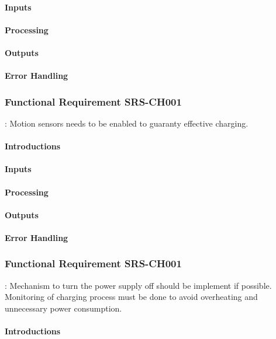 \documentclass[a4paper]{article}
\begin{document}
\paragraph{Inputs}
\paragraph{Processing}
\paragraph{Outputs}
\paragraph{Error Handling}

\subsubsection{Functional Requirement SRS-CH001}
: Motion sensors needs to be enabled to guaranty effective charging.
\paragraph{Introductions}
\paragraph{Inputs}
\paragraph{Processing}
\paragraph{Outputs}
\paragraph{Error Handling}

\subsubsection{Functional Requirement SRS-CH001}
: Mechanism to turn the power supply off should be implement if possible. Monitoring of charging process must be done to avoid overheating and unnecessary  power consumption.
\paragraph{Introductions}
\end{document}
